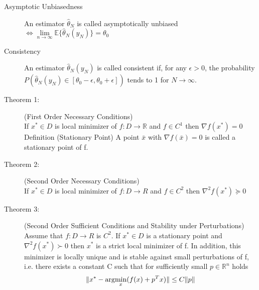 \begin{tcolorbox}[colback=cyan!5!white,colframe=cyan!75!black,title=\textbf{Useful statistic definitions}]
\begin{description}
	\item[\small Asymptotic Unbiasedness]  An estimator $\hat \theta_N$ is called asymptotically unbiased $\Leftrightarrow \lim\limits_{n \to \infty} \mathbb{E}\{\hat \theta_N (y_N) \} = \theta_0$
	
	\item[\small Consistency] An estimator $\hat \theta_N (y_N)$ is called consistent if, for any $\epsilon > 0$, the probability $P(\hat \theta_N (y_N) \in [\theta_0 - \epsilon, \theta_0 + \epsilon])$ tends to 1 for $N \rightarrow \infty$.
	\end{description}
\end{tcolorbox}

\begin{tcolorbox}[colback=blue!5!white,colframe=blue!75!black,title=\textbf{Unconstrainded Optimization}]
\begin{description}
	\item[\small Theorem 1:](First Order Necessary Conditions)\\
		If $x^* \in D$ is local minimizer of $f : D \rightarrow \mathbb{R}$ and $f \in C^1$ then
		$\nabla f (x^*) = 0$
		Definition (Stationary Point) A point $\bar{x}$ with $\nabla f(\bar{x}) = 0$ is called a stationary point of f.
	
	\item[\small Theorem 2:] (Second Order Necessary Conditions)\\
		If $x^* \in D$ is local minimizer of $f : D \rightarrow R$ and $f \in C^2$ then
		$\nabla^2 f(x^*) \succeq 0$
	
	\item[\small Theorem 3:] (Second Order Sufficient Conditions and Stability under Perturbations)\\
		Assume that $f : D \rightarrow R$ is $C^2.$ If $x^* \in D$ is a stationary point and
		$ \nabla^2 f(x^*) \succ 0$
		then $x^*$ is a strict local minimizer of f. In addition, this minimizer is locally unique and is stable against small perturbations of f, i.e. there exists a constant C such that for sufficiently small $p \in \mathbb{R}^n$ holds\\
		\begin{equation*}
		\lVert{x^* - \arg\!\min_x  (f(x) + p^T x)}\rVert \leq C \lVert p \rVert
		\end{equation*}	
\end{description}
\end{tcolorbox}
